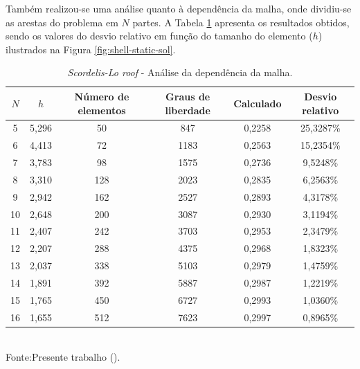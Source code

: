 Também realizou-se uma análise quanto à dependência da malha, onde dividiu-se as arestas do problema em $N$ partes. A Tabela \ref{tab:scordelis-sol} apresenta os resultados obtidos, sendo os valores do desvio relativo em função do tamanho do elemento ($h$) ilustrados na Figura \ref{fig:shell-static-sol}.

\begin{table}[h!]
    \centering
    \caption{\textit{Scordelis-Lo roof} - Análise da dependência da malha.}
    \begin{tabular}{cccccc}
        \hline
        $N$ & $h$   & Número de elementos & Graus de liberdade & Calculado & Desvio relativo \\\hline
        5   & 5,296 & 50                  & 847                & 0,2258    & 25,3287\%       \\
        6   & 4,413 & 72                  & 1183               & 0,2563    & 15,2354\%       \\
        7   & 3,783 & 98                  & 1575               & 0,2736    & 9,5248\%        \\
        8   & 3,310 & 128                 & 2023               & 0,2835    & 6,2563\%        \\
        9   & 2,942 & 162                 & 2527               & 0,2893    & 4,3178\%        \\
        10  & 2,648 & 200                 & 3087               & 0,2930    & 3,1194\%        \\
        11  & 2,407 & 242                 & 3703               & 0,2953    & 2,3479\%        \\
        12  & 2,207 & 288                 & 4375               & 0,2968    & 1,8323\%        \\
        13  & 2,037 & 338                 & 5103               & 0,2979    & 1,4759\%        \\
        14  & 1,891 & 392                 & 5887               & 0,2987    & 1,2219\%        \\
        15  & 1,765 & 450                 & 6727               & 0,2993    & 1,0360\%        \\
        16  & 1,655 & 512                 & 7623               & 0,2997    & 0,8965\%        \\\hline
    \end{tabular}
    \\Fonte:Presente trabalho (\the\year).
    \label{tab:scordelis-sol}
\end{table}

